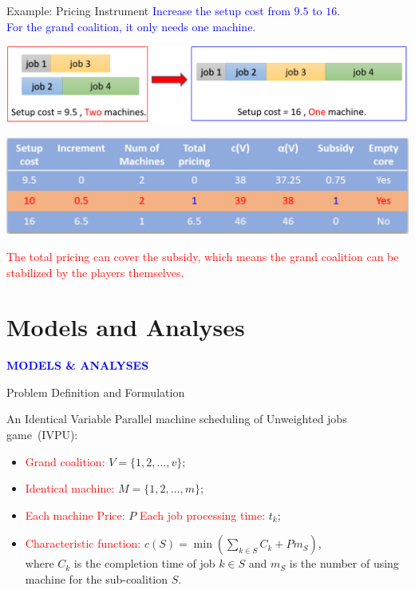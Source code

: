 \documentclass[14pt]{beamer}
\begin{document}
\begin{frame}{Example: Pricing Instrument}
\small
\centering
\textcolor{blue}{Increase the setup cost from $9.5$ to $16$.\\
For the grand coalition, it only needs one machine.}
\vspace{2mm}

\centering
\includegraphics[width = 1\textwidth]{Figures/m2.png}

\centering
\includegraphics[width = 1\textwidth]{Figures/m3.png}

\textcolor{red}{The total pricing can cover the subsidy, which means the grand coalition can be stabilized by the players themselves.}

\end{frame}

\section{Models and Analyses}
\begin{frame}
\centering
\large
\textcolor{blue}{\bf {\huge M}ODELS \&  {\huge A}NALYSES}
\end{frame}


\begin{frame}{Problem Definition and Formulation}
	\begin{definition}\label{definition:IVPU}
	\small
	\justifying
	An Identical Variable Parallel machine scheduling of Unweighted jobs game~(IVPU):\\
	\begin{itemize}
	\pause
	\item \textcolor{red}{Grand coalition:} $V = \{1,2,\ldots,v\}$;
	\pause
	\item \textcolor{red}{Identical machine:} $M = \{1,2,\ldots,m\}$;
	\pause
	\item \textcolor{red}{Each machine Price:} $P$  \textcolor{red}{Each job processing time:} $t_k$;
	\pause
	\item \textcolor{red}{Characteristic function:} $c(S) = \min(\sum_{k\in S}C_k + Pm_S)$,\\
	\vspace{3mm}
	where $C_k$ is the completion time of job $k \in S$ and $m_S$ is the number of using machine for the sub-coalition $S$.
	\end{itemize}
	\end{definition}
\end{frame}
\end{document}
